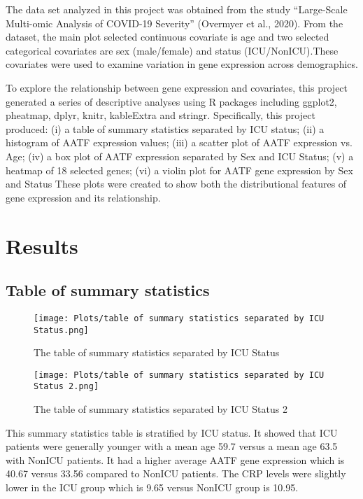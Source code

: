\documentclass{article}
\begin{document}
The data set analyzed in this project was obtained from the study “Large-Scale Multi-omic Analysis of COVID-19 Severity” (Overmyer et al., 2020). From the dataset, the main plot selected continuous covariate is age and two selected categorical covariates are sex (male/female) and status (ICU/NonICU).These covariates were used to examine variation in gene expression across demographics.

To explore the relationship between gene expression and covariates, this project generated a series of descriptive analyses using R packages including ggplot2, pheatmap, dplyr, knitr, kableExtra and stringr. 
Specifically, this project produced:
(i) a table of summary statistics separated by ICU status;
(ii) a histogram of AATF expression values;
(iii) a scatter plot of AATF expression vs. Age;
(iv) a box plot of AATF expression separated by Sex and ICU Status;
(v) a heatmap of 18 selected genes;
(vi) a violin plot for AATF gene expression by Sex and Status
These plots were created to show both the distributional features of gene expression and its relationship.

\section{Results}
\subsection{Table of summary statistics}
\begin{figure}[H]
    \centering
    \texttt{[image: Plots/table of summary statistics separated by ICU Status.png]}
    \caption{The table of summary statistics separated by ICU Status}
    \label{fig:placeholder}
\end{figure}
\begin{figure}[H]
    \centering
    \texttt{[image: Plots/table of summary statistics separated by ICU Status 2.png]}
    \caption{The table of summary statistics separated by ICU Status 2}
    \label{fig:placeholder}
\end{figure}
This summary statistics table is stratified by ICU status. It showed that ICU patients were generally younger with a mean age 59.7 versus a mean age 63.5 with NonICU patients. It had a higher average AATF gene expression which is 40.67 versus 33.56 compared to NonICU patients. The CRP levels were slightly lower in the ICU group which is 9.65 versus NonICU group is 10.95.
\end{document}
